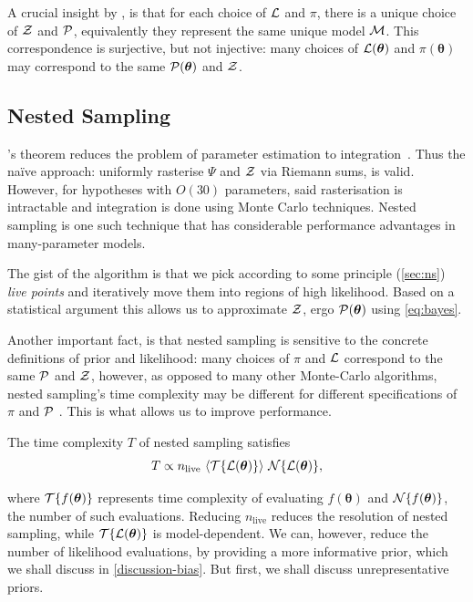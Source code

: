 \documentclass[usenatbib]{mnras}
\begin{document}
A crucial insight by \citeauthor{chen-ferroz-hobson}, is that for each
choice of ${\cal L}$ and $\pi$, there is a unique choice of ${\cal Z}$
and ${\cal P}$, equivalently they represent the same unique model
${\cal M}$. This correspondence is surjective, but not injective: many
choices of \({\cal L}(\bm{\theta})\) and \(\pi (\bm{\theta})\) may
correspond to the same \( {\cal P} (\bm{\theta})\) and \({\cal Z}\). 


\subsection{Nested Sampling}\label{sec:org36366f8}

\citeauthor{1763}'s theorem reduces the problem of parameter
estimation to integration~\citep{bayes-integration}. Thus the naïve
approach: uniformly rasterise \(\Psi\) and \({\cal Z}\) via Riemann
sums, is valid. However, for hypotheses with \(O(30)\) parameters,
said rasterisation is intractable \citep{Caflisch_1998} and
integration is done using Monte Carlo techniques. Nested sampling is
one such technique that has considerable performance advantages in
many-parameter models.

The gist of the algorithm \citep{Skilling} is that we pick according
to some principle (\cref{sec:ns}) \emph{live points} and iteratively
move them into regions of high likelihood. Based on a statistical
argument this allows us to approximate ${\cal Z}$, ergo
${\cal P}(\bm{\theta})$ using \cref{eq:bayes}.

Another important fact, is that nested sampling is sensitive to the
concrete definitions of prior and likelihood: many choices of $\pi$
and ${\cal L}$ correspond to the same ${\cal P}$ and ${\cal Z}$,
however, as opposed to many other Monte-Carlo algorithms, nested
sampling's time complexity may be different for different
specifications of $\pi$ and ${\cal P}$
\citep{chen-ferroz-hobson}. This is what allows us to improve
performance.

The time complexity $T$ of nested sampling satisfies
\begin{equation}\label{eq:complexity}
    T \propto  n_\text{live}\  \langle {\cal T}\{{\cal L}(\bm{\theta})\} \rangle \ {\cal N}\{{\cal L}(\bm{\theta}) \},
\end{equation}

where ${\cal T}\{f(\bm{\theta})\}$ represents time complexity of
evaluating $f(\bm{\theta})$ and ${\cal N}\{f(\bm{\theta})\}$, the
number of such evaluations. Reducing $n_\text{live}$ reduces the
resolution of nested sampling, while
$ {\cal T}\{{\cal L}(\bm{\theta})\}$ is model-dependent. We can,
however, reduce the number of likelihood evaluations, by providing a
more informative prior, which we shall discuss in
\cref{discussion-bias}. But first, we shall discuss unrepresentative
priors.
\end{document}
